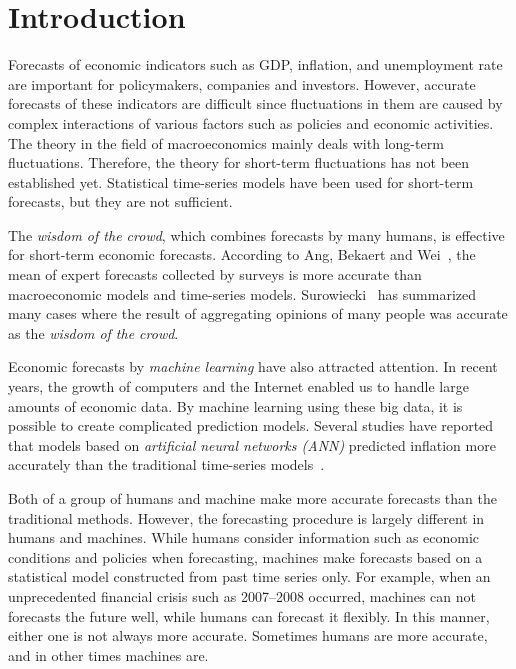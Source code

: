 \documentclass[../main.tex]{subfiles}
\begin{document}
\section{Introduction}
\label{sec: Introduction}

Forecasts of economic indicators such as GDP, inflation, and unemployment rate are important for policymakers, companies and investors.
However, accurate forecasts of these indicators are difficult since fluctuations in them are caused by complex interactions of various factors such as policies and economic activities.
The theory in the field of macroeconomics mainly deals with long-term fluctuations.  Therefore, the theory for short-term fluctuations has not been established yet.
Statistical time-series models have been used for short-term forecasts, but they are not sufficient.

The \emph{wisdom of the crowd}, which combines forecasts by many humans, is effective for short-term economic forecasts.
According to Ang, Bekaert and Wei~\cite{Ang2007}, the mean of expert forecasts collected by surveys is more accurate than macroeconomic models and time-series models.
Surowiecki~\cite{Surowiecki2004} has summarized many cases where the result of aggregating opinions of many people was accurate as the \emph{wisdom of the crowd}.

Economic forecasts by \emph{machine learning} have also attracted attention.
In recent years, the growth of computers and the Internet enabled us to handle large amounts of economic data.
By machine learning using these big data, it is possible to create complicated prediction models.
Several studies have reported that models based on \emph{artificial neural networks (ANN)} predicted inflation more accurately than the traditional time-series models~\cite{Choudhary2012, Moshiri2000, Nakamura2005}.

Both of a group of humans and machine make more accurate forecasts than the traditional methods.
However, the forecasting procedure is largely different in humans and machines.
While humans consider information such as economic conditions and policies when forecasting, machines make forecasts based on a statistical model constructed from past time series only.
For example, when an unprecedented financial crisis such as 2007--2008 occurred, machines can not forecasts the future well, while humans can forecast it flexibly.
In this manner, either one is not always more accurate.  Sometimes humans are more accurate, and in other times machines are.
\end{document}
